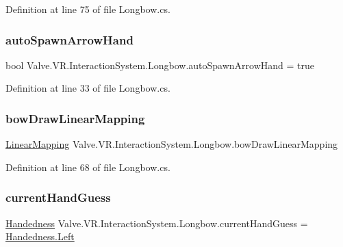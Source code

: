 Definition at line 75 of file Longbow.\+cs.

\mbox{\label{class_valve_1_1_v_r_1_1_interaction_system_1_1_longbow_af05bb2dbf9bc54f282088d4d2a4753ca}} 
\subsubsection{\texorpdfstring{autoSpawnArrowHand}{autoSpawnArrowHand}}
{\footnotesize\ttfamily bool Valve.\+V\+R.\+Interaction\+System.\+Longbow.\+auto\+Spawn\+Arrow\+Hand = true}



Definition at line 33 of file Longbow.\+cs.

\mbox{\label{class_valve_1_1_v_r_1_1_interaction_system_1_1_longbow_ac8567eb47c06e6daee08d40022ba86b6}} 
\subsubsection{\texorpdfstring{bowDrawLinearMapping}{bowDrawLinearMapping}}
{\footnotesize\ttfamily \mbox{\hyperlink{class_valve_1_1_v_r_1_1_interaction_system_1_1_linear_mapping}{Linear\+Mapping}} Valve.\+V\+R.\+Interaction\+System.\+Longbow.\+bow\+Draw\+Linear\+Mapping}



Definition at line 68 of file Longbow.\+cs.

\mbox{\label{class_valve_1_1_v_r_1_1_interaction_system_1_1_longbow_a50efe1398921e159ce3e7a3ddd228799}} 
\subsubsection{\texorpdfstring{currentHandGuess}{currentHandGuess}}
{\footnotesize\ttfamily \mbox{\hyperlink{class_valve_1_1_v_r_1_1_interaction_system_1_1_longbow_a1a13793c73b85cc47cc323af991169be}{Handedness}} Valve.\+V\+R.\+Interaction\+System.\+Longbow.\+current\+Hand\+Guess = \mbox{\hyperlink{class_valve_1_1_v_r_1_1_interaction_system_1_1_longbow_a1a13793c73b85cc47cc323af991169bea945d5e233cf7d6240f6b783b36a374ff}{Handedness.\+Left}}}



